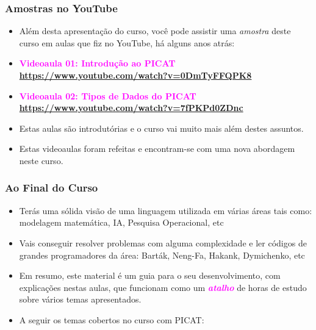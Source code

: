     
\begin{frame}[fragile]
  \frametitle{Amostras no YouTube}
  
  \begin{itemize}

    \item Além desta  apresentação do curso, você pode assistir uma \textit{amostra}
     deste curso em aulas  que fiz no YouTube, há alguns anos atrás:

    \pause
    \item \textcolor{magenta}{\textbf{Videoaula 01: Introdução ao PICAT}}\\
    \textbf{\url {https://www.youtube.com/watch?v=0DmTyFFQPK8}}

    \pause 
    \item \textcolor{magenta}{\textbf{Videoaula 02: Tipos de Dados do PICAT}}\\
    \textbf{\url {https://www.youtube.com/watch?v=7fPKPd0ZDnc}} 
    
    \item Estas aulas são introdutórias e o curso vai muito mais além destes
    assuntos.
    
    \pause 
    \item Estas videoaulas foram refeitas e  encontram-se com uma nova abordagem
    neste curso. 
    
  \end{itemize}

\end{frame}




\begin{frame}[fragile]
  \frametitle{Ao Final do Curso}
  \begin{itemize}

						
    \item Terás uma sólida visão  de uma linguagem
    utilizada em várias áreas tais como: modelagem matemática, IA,
    Pesquisa Operacional, etc

    \pause
    \item Vais conseguir resolver problemas com alguma complexidade e ler
    códigos de grandes programadores da área: Barták, Neng-Fa, Hakank, Dymichenko, etc    
    
    \pause
		\item Em resumo, este material é  um guia para o seu desenvolvimento,
		 com explicações nestas aulas, que funcionam como um \textcolor{magenta}{\textbf{\textit{atalho}}}
		  de horas de estudo sobre vários temas apresentados.
   
    \pause
    \item A seguir os temas cobertos no curso com PICAT:
  \end{itemize}

\end{frame}





